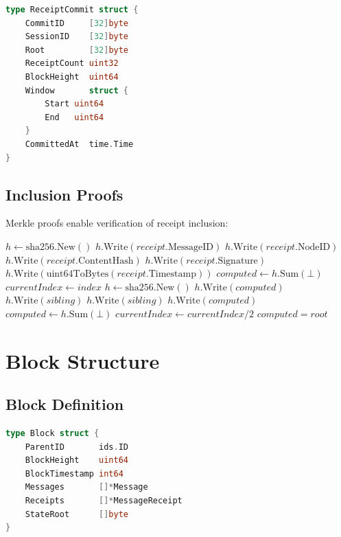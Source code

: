 \documentclass[11pt,twocolumn]{article}
\begin{document}
\begin{lstlisting}[language=Go,basicstyle=\ttfamily\small]
type ReceiptCommit struct {
    CommitID     [32]byte
    SessionID    [32]byte
    Root         [32]byte
    ReceiptCount uint32
    BlockHeight  uint64
    Window       struct {
        Start uint64
        End   uint64
    }
    CommittedAt  time.Time
}
\end{lstlisting}

\subsection{Inclusion Proofs}

Merkle proofs enable verification of receipt inclusion:

\begin{algorithm}
\caption{Verify Receipt Inclusion}
\label{alg:verify-receipt}
\begin{algorithmic}[1]
    \State $h \gets \text{sha256.New}()$
    \State $h.\text{Write}(receipt.\text{MessageID})$
    \State $h.\text{Write}(receipt.\text{NodeID})$
    \State $h.\text{Write}(receipt.\text{ContentHash})$
    \State $h.\text{Write}(receipt.\text{Signature})$
    \State $h.\text{Write}(\text{uint64ToBytes}(receipt.\text{Timestamp}))$
    \State $computed \gets h.\text{Sum}(\bot)$
    \State $currentIndex \gets index$
        \State $h \gets \text{sha256.New}()$
            \State $h.\text{Write}(computed)$
            \State $h.\text{Write}(sibling)$
        \Else
            \State $h.\text{Write}(sibling)$
            \State $h.\text{Write}(computed)$
        \EndIf
        \State $computed \gets h.\text{Sum}(\bot)$
        \State $currentIndex \gets currentIndex / 2$
    \EndFor
    \State \Return $computed = root$
\EndProcedure
\end{algorithmic}
\end{algorithm}

\section{Block Structure}

\subsection{Block Definition}

\begin{lstlisting}[language=Go,basicstyle=\ttfamily\small]
type Block struct {
    ParentID       ids.ID
    BlockHeight    uint64
    BlockTimestamp int64
    Messages       []*Message
    Receipts       []*MessageReceipt
    StateRoot      []byte
}
\end{lstlisting}
\end{document}
